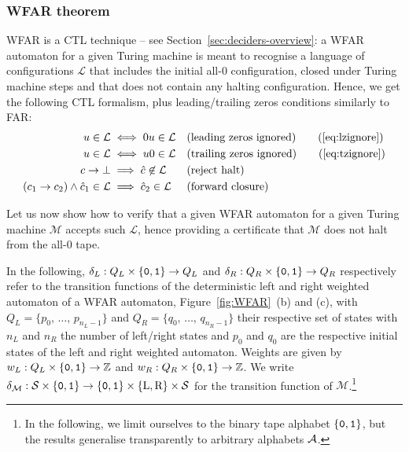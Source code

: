 \subsubsection{WFAR theorem}

WFAR is a CTL technique -- see Section~\ref{sec:deciders-overview}: a WFAR automaton for a given Turing machine is meant to recognise a language of configurations $\mathcal{L}$ that includes the initial all-0 configuration, closed under Turing machine steps and that does not contain any halting configuration. Hence, we get the following CTL formalism, plus leading/trailing zeros conditions similarly to FAR:
\begin{align}
    u \in \mathcal{L}                               & \iff 0u \in \mathcal{L}               &  & \text{(leading zeros ignored)}
    \tag{\ref{eq:lzignore}}
    \\
    u \in \mathcal{L}                               & \iff u0 \in \mathcal{L}               &  & \text{(trailing zeros ignored)}
    \tag{\ref{eq:tzignore}}
    \\
    c\TMstep\bot                                    & \implies \hat{c} \not \in \mathcal{L} &  & \text{(reject halt)} \label{eq:rejecthalt}     \\
    (c_1\TMstep c_2)\land \hat{c}_1 \in \mathcal{L} & \implies\hat{c}_2 \in \mathcal{L}     &  & \text{(forward closure)} \label{eq:forwardclo}
\end{align}

Let us now show how to verify that a given WFAR automaton for a given Turing machine $\mathcal{M}$ accepts such $\mathcal{L}$, hence providing a certificate that $\mathcal{M}$ does not halt from the all-0 tape.

In the following, $\delta_L: Q_L \times \left\{\texttt{0},\texttt{1}\right\} \to Q_L$ and $\delta_R: Q_R \times \left\{\texttt{0},\texttt{1}\right\} \to Q_R$ respectively refer to the transition functions of the deterministic left and right weighted automaton of a WFAR automaton, \eg Figure~\ref{fig:WFAR}~(b) and (c), with $Q_L = \{p_0, \, \dots, \, p_{n_L-1}\}$ and $Q_R = \{q_0, \, \dots, \, q_{n_R-1}\}$ their respective set of states with $n_L$ and $n_R$ the number of left/right states and $p_0$ and $q_0$ are the respective initial states of the left and right weighted automaton. Weights are given by $w_L: Q_L \times \left\{\texttt{0},\texttt{1}\right\} \to \mathbb{Z}$ and $w_R: Q_R \times \left\{\texttt{0},\texttt{1}\right\} \to \mathbb{Z}$. We write $\delta_\mathcal{M}:\mathcal{S} \times \left\{\texttt{0},\texttt{1}\right\} \to \left\{\texttt{0},\texttt{1}\right\} \times \{\text{L},\text{R}\} \times \mathcal{S}$ for the transition function of $\mathcal{M}$.\footnote{In the following, we limit ourselves to the binary tape alphabet $\left\{\texttt{0},\texttt{1}\right\}$, but the results generalise transparently to arbitrary alphabets $\mathcal{A}$.}

